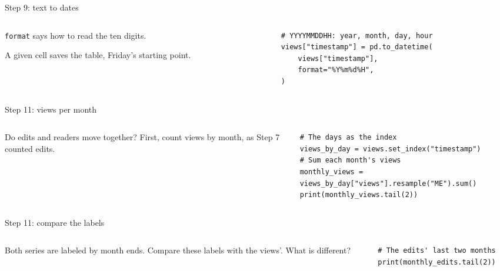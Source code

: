\documentclass[9pt,aspectratio=169]{beamer}
\begin{document}
\begin{frame}[fragile]{Step 9: text to dates}
    \begin{columns}[T]
        \begin{column}{0.37\textwidth}
            \texttt{format} says how to read the ten digits.

            \medskip
            A given cell saves the table, Friday's starting point.
        \end{column}
        \begin{column}{0.6\textwidth}
\begin{lstlisting}
# YYYYMMDDHH: year, month, day, hour
views["timestamp"] = pd.to_datetime(
    views["timestamp"],
    format="%Y%m%d%H",
)
\end{lstlisting}
        \end{column}
    \end{columns}
\end{frame}

\begin{frame}[fragile]{Step 11: views per month}
    \begin{columns}[T]
        \begin{column}{0.37\textwidth}
            Do edits and readers move together? First, count views by month, as Step 7 counted edits.
        \end{column}
        \begin{column}{0.6\textwidth}
\begin{lstlisting}
# The days as the index
views_by_day = views.set_index("timestamp")
# Sum each month's views
monthly_views = views_by_day["views"].resample("ME").sum()
print(monthly_views.tail(2))
\end{lstlisting}
        \end{column}
    \end{columns}
\end{frame}

\begin{frame}[fragile]{Step 11: compare the labels}
    \begin{columns}[T]
        \begin{column}{0.37\textwidth}
            Both series are labeled by month ends. Compare these labels with the views'. What is different?
        \end{column}
        \begin{column}{0.6\textwidth}
\begin{lstlisting}
# The edits' last two months
print(monthly_edits.tail(2))
\end{lstlisting}
        \end{column}
    \end{columns}
\end{frame}
\end{document}
